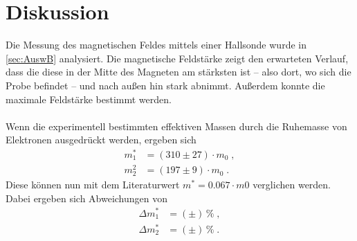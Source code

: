 \section{Diskussion}
\label{sec:Diskussion}
Die Messung des magnetischen Feldes mittels einer Hallsonde wurde in \autoref{sec:AuswB} analysiert. Die magnetische Feldstärke zeigt den 
erwarteten Verlauf, dass die diese in der Mitte des Magneten am stärksten ist -- also dort, wo sich die Probe befindet -- und nach außen hin 
stark abnimmt. Außerdem konnte die maximale Feldstärke bestimmt werden. \\
\\
Wenn die experimentell bestimmten effektiven Massen durch die Ruhemasse von Elektronen ausgedrückt werden, ergeben sich 
\begin{align*}
    m^*_1 &= (310 \pm 27)\cdot m_0 \; , \\
    m^2_2 &= (197\pm 9)\cdot m_0 \; .
\end{align*}
Diese können nun mit dem Literaturwert $m^* = 0.067\cdot m0$ \cite{effM} verglichen werden. Dabei ergeben sich Abweichungen von
\begin{align*}
    \Delta m^*_1 &= ( \pm )\,\% \; , \\
    \Delta m^*_2 &= ( \pm )\,\% \; .
\end{align*}
